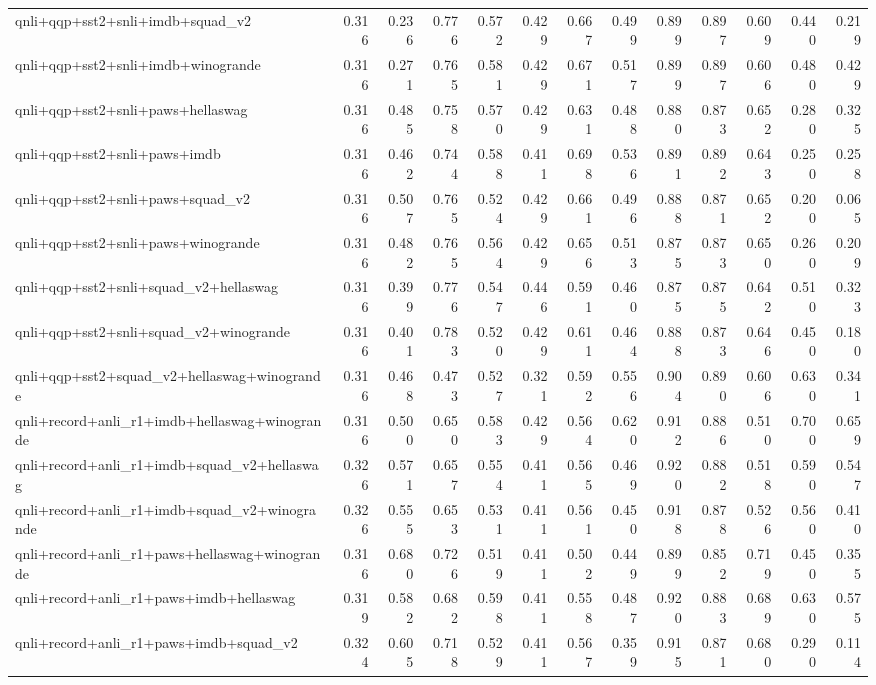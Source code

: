 \begin{table}[t]
\begin{tabular}{lrrrrrrrrrrrr}
    qnli+qqp+sst2+snli+imdb+squad\_v2 & 0.316 & 0.236 & 0.776 & 0.572 & 0.429 & 0.667 & 0.499 & 0.899 & 0.897 & 0.609 & 0.440 & 0.219 \\
    qnli+qqp+sst2+snli+imdb+winogrande & 0.316 & 0.271 & 0.765 & 0.581 & 0.429 & 0.671 & 0.517 & 0.899 & 0.897 & 0.606 & 0.480 & 0.429 \\
    qnli+qqp+sst2+snli+paws+hellaswag & 0.316 & 0.485 & 0.758 & 0.570 & 0.429 & 0.631 & 0.488 & 0.880 & 0.873 & 0.652 & 0.280 & 0.325 \\
    qnli+qqp+sst2+snli+paws+imdb & 0.316 & 0.462 & 0.744 & 0.588 & 0.411 & 0.698 & 0.536 & 0.891 & 0.892 & 0.643 & 0.250 & 0.258 \\
    qnli+qqp+sst2+snli+paws+squad\_v2 & 0.316 & 0.507 & 0.765 & 0.524 & 0.429 & 0.661 & 0.496 & 0.888 & 0.871 & 0.652 & 0.200 & 0.065 \\
    qnli+qqp+sst2+snli+paws+winogrande & 0.316 & 0.482 & 0.765 & 0.564 & 0.429 & 0.656 & 0.513 & 0.875 & 0.873 & 0.650 & 0.260 & 0.209 \\
    qnli+qqp+sst2+snli+squad\_v2+hellaswag & 0.316 & 0.399 & 0.776 & 0.547 & 0.446 & 0.591 & 0.460 & 0.875 & 0.875 & 0.642 & 0.510 & 0.323 \\
    qnli+qqp+sst2+snli+squad\_v2+winogrande & 0.316 & 0.401 & 0.783 & 0.520 & 0.429 & 0.611 & 0.464 & 0.888 & 0.873 & 0.646 & 0.450 & 0.180 \\
    qnli+qqp+sst2+squad\_v2+hellaswag+winogrande & 0.316 & 0.468 & 0.473 & 0.527 & 0.321 & 0.592 & 0.556 & 0.904 & 0.890 & 0.606 & 0.630 & 0.341 \\
    qnli+record+anli\_r1+imdb+hellaswag+winogrande & 0.316 & 0.500 & 0.650 & 0.583 & 0.429 & 0.564 & 0.620 & 0.912 & 0.886 & 0.510 & 0.700 & 0.659 \\
    qnli+record+anli\_r1+imdb+squad\_v2+hellaswag & 0.326 & 0.571 & 0.657 & 0.554 & 0.411 & 0.565 & 0.469 & 0.920 & 0.882 & 0.518 & 0.590 & 0.547 \\
    qnli+record+anli\_r1+imdb+squad\_v2+winogrande & 0.326 & 0.555 & 0.653 & 0.531 & 0.411 & 0.561 & 0.450 & 0.918 & 0.878 & 0.526 & 0.560 & 0.410 \\
    qnli+record+anli\_r1+paws+hellaswag+winogrande & 0.316 & 0.680 & 0.726 & 0.519 & 0.411 & 0.502 & 0.449 & 0.899 & 0.852 & 0.719 & 0.450 & 0.355 \\
    qnli+record+anli\_r1+paws+imdb+hellaswag & 0.319 & 0.582 & 0.682 & 0.598 & 0.411 & 0.558 & 0.487 & 0.920 & 0.883 & 0.689 & 0.630 & 0.575 \\
    qnli+record+anli\_r1+paws+imdb+squad\_v2 & 0.324 & 0.605 & 0.718 & 0.529 & 0.411 & 0.567 & 0.359 & 0.915 & 0.871 & 0.680 & 0.290 & 0.114 \\

\end{tabular}
\end{table}
